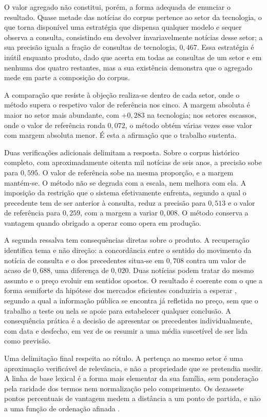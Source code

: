 O valor agregado não constitui, porém, a forma adequada de enunciar o resultado. Quase metade das
notícias do corpus pertence ao setor da tecnologia, o que torna disponível uma estratégia que
dispensa qualquer modelo e sequer observa a consulta, consistindo em devolver invariavelmente
notícias desse setor; a sua precisão iguala a fração de consultas de tecnologia, $0{,}467$. Essa
estratégia é inútil enquanto produto, dado que acerta em todas as consultas de um setor e em nenhuma
dos quatro restantes, mas a sua existência demonstra que o agregado mede em parte a composição do
corpus.

A comparação que resiste à objeção realiza-se dentro de cada setor, onde o método supera o
respetivo valor de referência nos cinco. A margem absoluta é maior no setor mais abundante, com
$+0{,}283$ na tecnologia; nos setores escassos, onde o valor de referência ronda $0{,}072$, o método
obtém várias vezes esse valor com margem absoluta menor. É esta a afirmação que o trabalho
sustenta.

Duas verificações adicionais delimitam a resposta. Sobre o corpus histórico completo, com aproximadamente oitenta mil notícias de seis anos, a
precisão sobe para $0{,}595$. O valor de referência sobe na mesma proporção, e a margem mantém-se.
O método não se degrada com a escala, nem melhora com ela. A imposição da restrição que o sistema
efetivamente enfrenta, segundo a qual o precedente tem de ser anterior à consulta, reduz a precisão
para $0{,}513$ e o valor de referência para $0{,}259$, com a margem a variar $0{,}008$. O método
conserva a vantagem quando obrigado a operar como opera em produção.

A segunda ressalva tem consequências diretas sobre o produto. A recuperação identifica tema e não
direção: a concordância entre o sentido do movimento da notícia de consulta e o dos precedentes
situa-se em $0{,}708$ contra um valor de acaso de $0{,}688$, uma diferença de $0{,}020$. Duas
notícias podem tratar do mesmo assunto e o preço evoluir em sentidos opostos. O resultado é
coerente com o que a forma semiforte da hipótese dos mercados eficientes conduziria a esperar
\autocite{fama1970efficient}, segundo a qual a informação pública se encontra já refletida no preço,
sem que o trabalho a teste ou nela se apoie para estabelecer qualquer conclusão. A consequência
prática é a decisão de apresentar os precedentes individualmente, com data e desfecho, em vez de os
resumir a uma média suscetível de ser lida como previsão.

Uma delimitação final respeita ao rótulo. A pertença ao mesmo setor é uma aproximação verificável de
relevância, e não a propriedade que se pretendia medir. A linha de base lexical é a forma mais elementar da sua família, sem ponderação pela raridade dos
termos nem normalização pelo comprimento. Os dezassete pontos percentuais de vantagem medem a
distância a um ponto de partida, e não a uma função de ordenação afinada
\autocite{robertson2009bm25}.

